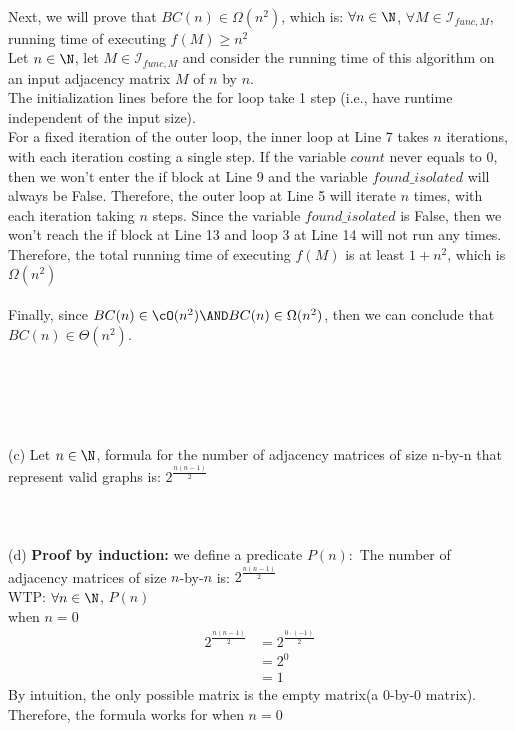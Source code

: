 \documentclass[12pt]{article}
\begin{document}
\\
Next, we will prove that $BC(n) \in \Omega(n^2)$, which is: $\forall n \in \N$, $\forall M \in \mathcal{I}_{func,M}$, running time of executing $f(M) \ge n^2$\\
Let $n \in \N$, let $M \in \mathcal{I}_{func,M}$ and consider the running time of this algorithm on an input adjacency matrix $M$ of $n$ by $n$.\\
The initialization lines before the for loop take 1 step (i.e., have runtime independent of the input size).\\
For a fixed iteration of the outer loop, the inner loop at Line 7 takes $n$ iterations, with each iteration costing a single step. If the variable $count$ never equals to 0, then we won't enter the if block at Line 9 and the variable $found\_isolated$ will always be False. Therefore, the outer loop at Line 5 will iterate $n$ times, with each iteration taking $n$ steps. Since the variable $found\_isolated$ is False, then we won't reach the if block at Line 13 and loop 3 at Line 14 will not run any times.\\
Therefore, the total running time of executing $f(M)$ is at least $1+n^2$, which is $\Omega(n^2)$\\
\\
Finally, since $BC(n) \in \cO(n^2) \AND BC(n) \in \Omega(n^2)$, then we can conclude that $BC(n) \in \Theta(n^2)$.
\\
\\
\\
\\
\\
\\
(c) Let $n \in \N$, formula for the number of adjacency matrices of size n-by-n that represent valid graphs is: $2^{\frac{n(n-1)}{2}}$\\
\\
\\
\\
(d) \textbf{Proof by induction:} we define a predicate $P(n):$ The number of adjacency matrices of size $n$-by-$n$ is: $2^{\frac{n(n-1)}{2}}$\\
WTP: $\forall n \in \N$, $P(n)$\\
\base\quad when $n = 0$
\begin{align*}
    \tag{since $n = 0$}
    2^{\frac{n(n-1)}{2}} &= 2^{\frac{0\cdot (-1)}{2}}\\
    &= 2^0\\
    &= 1
\end{align*}
By intuition, the only possible matrix is the empty matrix(a 0-by-0 matrix). Therefore, the formula works for when $n=0$\\
\end{document}
